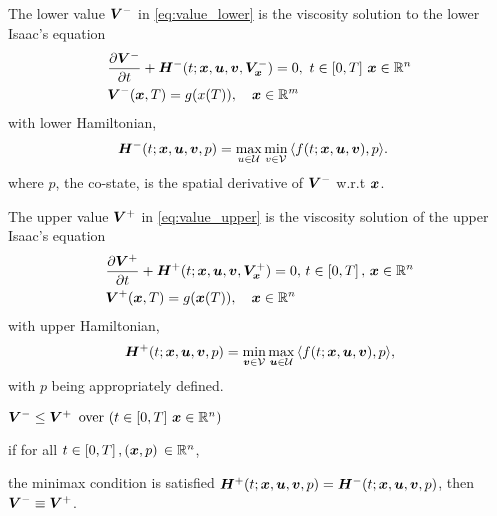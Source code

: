 %
\begin{lemma}
	The lower value $\bm{V}^-$ in \eqref{eq:value_lower} is the viscosity solution to the lower Isaac's equation 
	\begin{subequations}
		\begin{align}
			&\frac{\partial \lowervalue}{\partial t} + \lowerham (t; \state, \bm{u}, \bm{v}, \lowervalue_{\state}) = 0, \,\, t\in \left[0, T\right]\, \state \in \ren  \\
			&\lowervalue(\state, T) = g(x(T)), \quad \state \in \reline^m
			\label{eq:lower_visc_boundary}
		\end{align}
		\label{eq:lower_visc}
	\end{subequations}
	with lower Hamiltonian, 
	\begin{align}
		&\lowerham (t; \state, \bm{u}, \bm{v}, p) = \max_{u \in \mathcal{U}} \min_{v \in \mathcal{V}} \, \langle f(t; \state, \bm{u}, \bm{v}), p  \rangle.
		\label{eq:lower_visc_ham}
	\end{align}
%
where $p$, the co-state, is the spatial derivative of $\bm{V}^-$ w.r.t $\bm{x}$.
	\label{lemma:lower_visc_lemma}
\end{lemma}
%
\begin{lemma}
	The upper value $\bm{V}^+$ in \eqref{eq:value_upper} is the viscosity solution of the upper Isaac's equation 
	\begin{subequations}
		\begin{align}
			&\frac{\partial \bm{V}^+}{\partial t} + \bm{H}^+ (t; \bm{x}, \bm{u}, \bm{v},  \bm{V}^+_{\bm{x}})= 0, \, t\in \left[0,T\right],\, \bm{x} \in \mathbb{R}^n
			 \\
			&\bm{V}^+(\bm{x}, T) = g(\bm{x}(T)), \quad \bm{x} \in \mathbb{R}^n
		\end{align}
		\label{eq:upper_visc}
	\end{subequations}
	with upper Hamiltonian, 
	\begin{align}
		\bm{H}^+ (t; \bm{x}, \bm{u}, \bm{v}, p) = \min_{\bm{v} \in \mathcal{V}} \max_{\bm{u} \in \mathcal{U}} \, \langle f(t; \bm{x}, \bm{u}, \bm{v}), p \rangle,
	\end{align}
	with $p$ being appropriately defined.
	\label{lemma:upper_visc_lemma}
\end{lemma}
%
\begin{corollary}
	\begin{inparaenum}[(i)]
		\item  $\bm{V}^- \le \bm{V}^+ \, \text{ over } (t\in \left[0,T\right]\, \bm{x} \in \mathbb{R}^n)$
		\item if for all $t\in \left[0,T\right], (\bm{x}, p) \, \in \mathbb{R}^n$,
	\end{inparaenum} 
	the minimax condition is satisfied \ie 	$\bm{H}^+(t; \bm{x}, \bm{u}, \bm{v}, p) = \bm{H}^-(t; \bm{x}, \bm{u}, \bm{v}, p)$, then
	$\bm{V}^- \equiv \bm{V}^+$.
\end{corollary}
%


